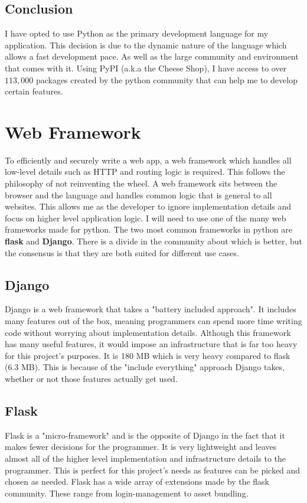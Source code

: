 \documentclass[a4paper,oneside,12pt]{report}
\begin{document}
	\subsection{Conclusion}
	I have opted to use Python as the primary development language for my application. This decision is due to the dynamic nature of the language which allows a fast development pace. As well as the large community and environment that comes with it. Using PyPI (a.k.a the Cheese Shop), I have access to over \(113,000\) packages created by the python community that can help me to develop certain features.

	\section{Web Framework}
	To efficiently and securely write a web app, a web framework which handles all low-level details such as HTTP and routing logic is required. This follows the philosophy of not reinventing the wheel. A web framework sits between the browser and the language and handles common logic that is general to all websites. This allows me as the developer to ignore implementation details and focus on higher level application logic. I will need to use one of the many web frameworks made for python. The two most common frameworks in python are \textbf{flask} and \textbf{Django}. There is a divide in the community about which is better, but the consensus is that they are both suited for different use cases.

	\subsection{Django}
	Django is a web framework that takes a "battery included approach". It includes many features out of the box, meaning programmers can spend more time writing code without worrying about implementation details. Although this framework has many useful features, it would impose an infrastructure that is far too heavy for this project's purposes. It is 180 MB which is very heavy compared to flask (6.3 MB). This is because of the "include everything" approach Django takes, whether or not those features actually get used.

	\subsection{Flask}
	Flask is a "micro-framework" and is the opposite of Django in the fact that it makes fewer decisions for the programmer. It is very lightweight and leaves almost all of the higher level implementation and infrastructure details to the programmer. This is perfect for this project's needs as features can be picked and chosen as needed. Flask has a wide array of extensions made by the flask community. These range from login-management to asset bundling.
	
\end{document}
